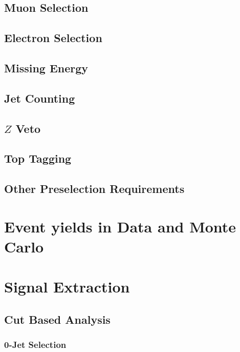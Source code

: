 \documentclass{cmspaper}
\begin{document}
  \subsection{Muon Selection} 
    \label{sec:sel_muons}
   
  \subsection{Electron Selection} 
    \label{sec:sel_electrons}
    
  \subsection{Missing Energy} 
    \label{sec:sel_met}
    
  \subsection{Jet Counting} 
    \label{sec:sel_jets}
    
  \subsection{$Z$ Veto}
    \label{sec:sel_zveto}
    
  \subsection{Top Tagging}
    \label{sec:sel_toptag}
    
  \subsection{Other Preselection Requirements}
    \label{sec:sel_other}
    

\section{Event yields in Data and Monte Carlo}
  \label{sec:yields}
  
    
\section{Signal Extraction}
  
  \label{sec:signal_selection}
  \subsection{Cut Based Analysis}
    \label{sec:anal_cutbased}
    \subsubsection{0-Jet Selection}
      \label{sec:sel_zerojet}
      
\end{document}
